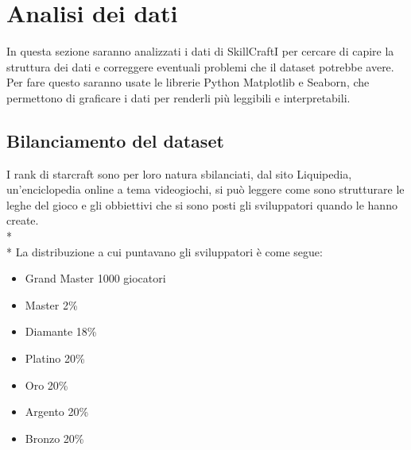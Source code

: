 \section{Analisi dei dati}\label{sec:analisi}
\normalsize
In questa sezione saranno analizzati i dati di SkillCraftI per cercare di capire la struttura dei dati e correggere eventuali problemi che il dataset potrebbe avere. Per fare questo saranno usate le librerie Python Matplotlib e Seaborn, che permettono di graficare i dati per renderli più leggibili e interpretabili.   
\subsection{Bilanciamento del dataset}\label{ssec:bilanciamento}
\normalsize
I rank di starcraft sono per loro natura sbilanciati, dal sito Liquipedia, un’enciclopedia online a tema videogiochi, si può leggere come sono strutturare le leghe del gioco e gli obbiettivi che si sono posti gli sviluppatori quando le hanno create. \\*\\*
La distribuzione a cui puntavano gli sviluppatori è come segue:
\begin{itemize}
	\item Grand Master 1000 giocatori
	\item Master 2\%
	\item Diamante 18\%
	\item Platino 20\%
	\item Oro 20\%
	\item Argento 20\% 
	\item Bronzo 20\%
\end{itemize}

